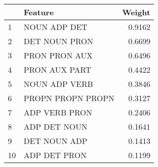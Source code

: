 \begin{tabular}{llr}
\toprule
{} &            Feature &  Weight \\
\midrule
1  &       NOUN ADP DET &  0.9162 \\
2  &      DET NOUN PRON &  0.6699 \\
3  &      PRON PRON AUX &  0.6496 \\
4  &      PRON AUX PART &  0.4422 \\
5  &      NOUN ADP VERB &  0.3846 \\
6  &  PROPN PROPN PROPN &  0.3127 \\
7  &      ADP VERB PRON &  0.2406 \\
8  &       ADP DET NOUN &  0.1641 \\
9  &       DET NOUN ADP &  0.1413 \\
10 &       ADP DET PRON &  0.1199 \\
\bottomrule
\end{tabular}

